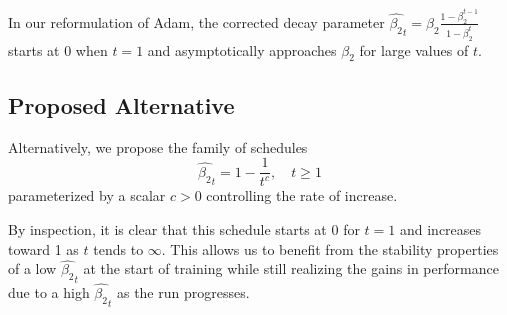 \documentclass{article}
\begin{document}

In our reformulation of Adam, the corrected decay parameter $\hat{\beta_2}_t = \beta_2 \frac{1 - \beta_2^{t-1}}{1 - \beta_2^t}$ starts at $0$ when $t=1$ and asymptotically approaches $\beta_2$ for large values of $t$.  

\subsection{Proposed Alternative}

Alternatively, we propose the family of schedules $$\hat{\beta_2}_t = 1 - \frac{1}{t^c}, \quad t \ge 1$$ parameterized by a scalar $c > 0$ controlling the rate of increase.

By inspection, it is clear that this schedule starts at 0 for $t = 1$ and increases toward 1 as $t$ tends to $\infty$. This allows us to benefit from the stability properties of a low $\hat{\beta_2}_t$ at the start of training while still realizing the gains in performance due to a high $\hat{\beta_2}_t$ as the run progresses.
\end{document}
